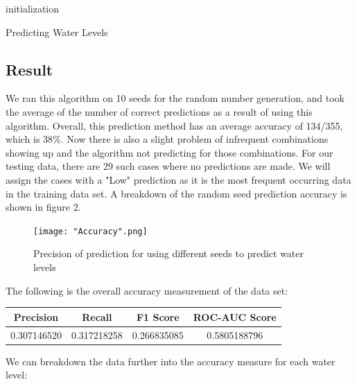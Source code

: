 \documentclass[10pt, conference, compsocconf]{IEEEtran}
\begin{document}
\begin{algorithm}
\SetAlgoLined
{}
    initialization\;
 \caption{Predicting Water Levels}
\end{algorithm}

\subsection{Result}
We ran this algorithm on 10 seeds for the random number generation, and took the average of the number of correct predictions as a result of using this algorithm. Overall, this prediction method has an average accuracy of 134/355, which is 38\%. Now there is also a slight problem of infrequent combinations showing up and the algorithm not predicting for those combinations. For our testing data, there are 29 such cases where no predictions are made. We will assign the cases with a "Low" prediction as it is the most frequent occurring data in the training data set. A breakdown of the random seed prediction accuracy is shown in figure 2.

\begin{figure}[H]
\texttt{[image: "Accuracy".png]}
\centering
\caption{Precision of prediction for using different seeds to predict water levels}
\end{figure}

The following is the overall accuracy measurement of the data set:\\

\begin{center}
\begin{tabular}{ |c|c|c|c| } 
 \hline
 Precision & Recall & F1 Score & ROC-AUC Score \\ 
 \hline
 0.307146520 & 0.317218258 & 0.266835085 & 0.5805188796 \\
 \hline
\end{tabular}
\end{center}

We can breakdown the data further into the accuracy measure for each water level:\\
\end{document}
